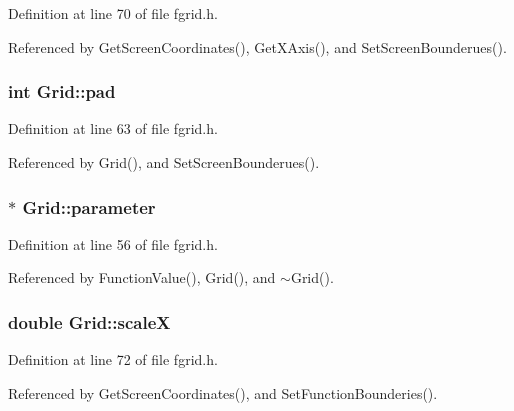 Definition at line 70 of file fgrid.\+h.



Referenced by Get\+Screen\+Coordinates(), Get\+X\+Axis(), and Set\+Screen\+Bounderues().

\subsubsection[{\texorpdfstring{pad}{pad}}]{\setlength{\rightskip}{0pt plus 5cm}int Grid\+::pad\hspace{0.3cm}{\ttfamily [private]}}\hypertarget{classGrid_a2bf4a157b130ed18d78d2e9a6760a6a8}{}\label{classGrid_a2bf4a157b130ed18d78d2e9a6760a6a8}


Definition at line 63 of file fgrid.\+h.



Referenced by Grid(), and Set\+Screen\+Bounderues().

\subsubsection[{\texorpdfstring{parameter}{parameter}}]{$\ast$ Grid\+::parameter\hspace{0.3cm}{\ttfamily [private]}}\hypertarget{classGrid_a37df3261f985852f871847769c8b833c}{}\label{classGrid_a37df3261f985852f871847769c8b833c}


Definition at line 56 of file fgrid.\+h.



Referenced by Function\+Value(), Grid(), and $\sim$\+Grid().

\subsubsection[{\texorpdfstring{scaleX}{scaleX}}]{\setlength{\rightskip}{0pt plus 5cm}double Grid\+::scaleX\hspace{0.3cm}{\ttfamily [private]}}\hypertarget{classGrid_a33d8811a6746553710cd815a535a9f13}{}\label{classGrid_a33d8811a6746553710cd815a535a9f13}


Definition at line 72 of file fgrid.\+h.



Referenced by Get\+Screen\+Coordinates(), and Set\+Function\+Bounderies().

